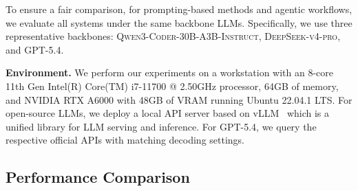 To ensure a fair comparison, for prompting-based methods and agentic workflows, we evaluate all systems under the same backbone LLMs.
Specifically, we use three representative backbones: \textsc{Qwen3-Coder-30B-A3B-Instruct}, \textsc{DeepSeek-v4-pro}, and \textsc{GPT-5.4}.


\textbf{Environment.} 
We perform our experiments on a workstation with an 8-core 11th Gen Intel(R) Core(TM) i7-11700 @ 2.50GHz processor, 64GB of memory, and NVIDIA RTX A6000 with 48GB of VRAM running Ubuntu 22.04.1 LTS.
For open-source LLMs, we deploy a local API server based on vLLM~\cite{kwon2023efficient} which is a unified library for LLM serving and inference.
For GPT-5.4, we query the respective official APIs with matching decoding settings.

\subsection{Performance Comparison}

